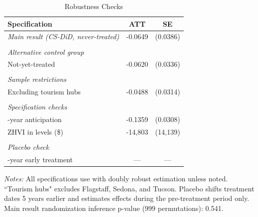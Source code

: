 
\begin{table}[H]
\centering
\caption{Robustness Checks}
\label{tab:robustness}
\begin{threeparttable}
\begin{tabular}{lcc}
\toprule
Specification & ATT & SE \\
\midrule
\textit{Main result (CS-DiD, never-treated)} & -0.0649 & (0.0386) \\
\\
\textit{Alternative control group} & & \\
\quad Not-yet-treated & -0.0620 & (0.0336) \\
\\
\textit{Sample restrictions} & & \\
\quad Excluding tourism hubs & -0.0488 & (0.0314) \\
\\
\textit{Specification checks} & & \\
\quad 1-year anticipation & -0.1359 & (0.0308) \\
\quad ZHVI in levels (\$) & -14,803 & (14,139) \\
\\
\textit{Placebo check} & & \\
\quad 5-year early treatment & --- & --- \\
\bottomrule
\end{tabular}
\begin{tablenotes}[flushleft]
\small
\item \textit{Notes:} All specifications use \citet{callaway2021difference} with doubly robust estimation unless noted. ``Tourism hubs" excludes Flagstaff, Sedona, and Tucson. Placebo shifts treatment dates 5 years earlier and estimates effects during the pre-treatment period only. Main result randomization inference p-value (999 permutations): 0.541.
\end{tablenotes}
\end{threeparttable}
\end{table}
